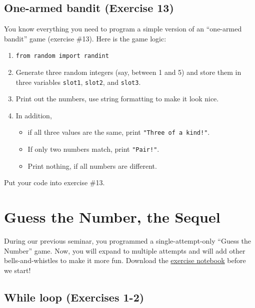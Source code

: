 \documentclass[
]{book}
\providecommand{\tightlist}{%
  \setlength{\itemsep}{0pt}\setlength{\parskip}{0pt}}
\begin{document}
\hypertarget{one-armed-bandit-exercise-13}{%
\section{One-armed bandit (Exercise 13)}\label{one-armed-bandit-exercise-13}}

You know everything you need to program a simple version of an ``one-armed bandit'' game (exercise \#13). Here is the game logic:

\begin{enumerate}
\def\labelenumi{\arabic{enumi}.}
\tightlist
\item
  \texttt{from\ random\ import\ randint}
\item
  Generate three random integers (say, between 1 and 5) and store them in three variables \texttt{slot1}, \texttt{slot2}, and \texttt{slot3}.
\item
  Print out the numbers, use string formatting to make it look nice.
\item
  In addition,

  \begin{itemize}
  \tightlist
  \item
    if all three values are the same, print \texttt{"Three\ of\ a\ kind!"}.
  \item
    If only two numbers match, print \texttt{"Pair!"}.
  \item
    Print nothing, if all numbers are different.
  \end{itemize}
\end{enumerate}

Put your code into exercise \#13.

\hypertarget{seminar03}{%
\chapter{Guess the Number, the Sequel}\label{seminar03}}

During our previous seminar, you programmed a single-attempt-only ``Guess the Number'' game. Now, you will expand to multiple attempts and will add other bells-and-whistles to make it more fun. Download the \href{notebooks/Seminar\%2003.\%20Guess\%20the\%20number,\%20part\%202.ipynb}{exercise notebook} before we start!

\hypertarget{while-loop}{%
\section{While loop (Exercises 1-2)}\label{while-loop}}
\end{document}
